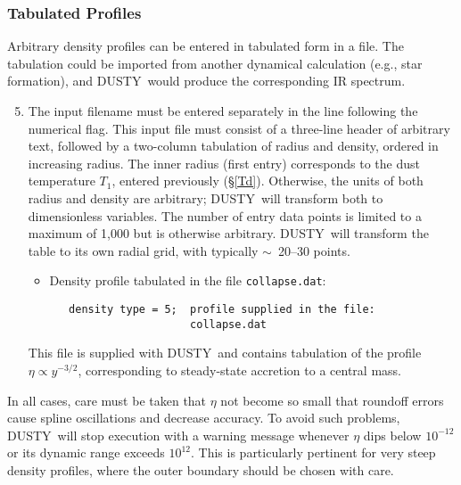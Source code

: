 \documentclass[12pt]{article} \usepackage{epsf}
\def\D  {{\sf DUSTY}}
\def\E#1{\hbox{$10^{#1}$}}
\def\about  {\hbox{$\sim$}}
\def\tthdump#1{#1}      %
\begin{document}
\subsubsection          {Tabulated Profiles}

Arbitrary density profiles can be entered in tabulated form in a file.  The
tabulation could be imported from another dynamical calculation (e.g., star
formation), and \D\ would produce the corresponding IR spectrum.

\begin{enumerate}
\setcounter{enumi}{4} \tthdump{\item}
The input filename must be entered separately in the line following the
numerical flag. This input file must consist of a three-line header of
arbitrary text, followed by a two-column tabulation of radius and density,
ordered in increasing radius.  The inner radius (first entry) corresponds to
the dust temperature $T_1$, entered previously (\S \ref{Td}).  Otherwise, the
units of both radius and density are arbitrary; \D\ will transform both to
dimensionless variables. The number of entry data points is limited to a
maximum of 1,000 but is otherwise arbitrary. \D\ will transform the table to
its own radial grid, with typically \about\ 20--30 points.

\begin{itemize}
\item Density profile tabulated in the file {\tt collapse.dat}:

\begin{verbatim}
   density type = 5;  profile supplied in the file:
                      collapse.dat
\end{verbatim}
\end{itemize}

This file is supplied with \D\ and contains tabulation of the profile $\eta
\propto y^{-3/2}$, corresponding to steady-state accretion to a central mass.

\end{enumerate}

In all cases, care must be taken that $\eta$ not become so small that roundoff
errors cause spline oscillations and decrease accuracy.  To avoid such
problems, \D\ will stop execution with a warning message whenever $\eta$ dips
below \E{-12} or its dynamic range exceeds \E{12}.  This is particularly
pertinent for very steep density profiles, where the outer boundary should be
chosen with care.
\end{document}
